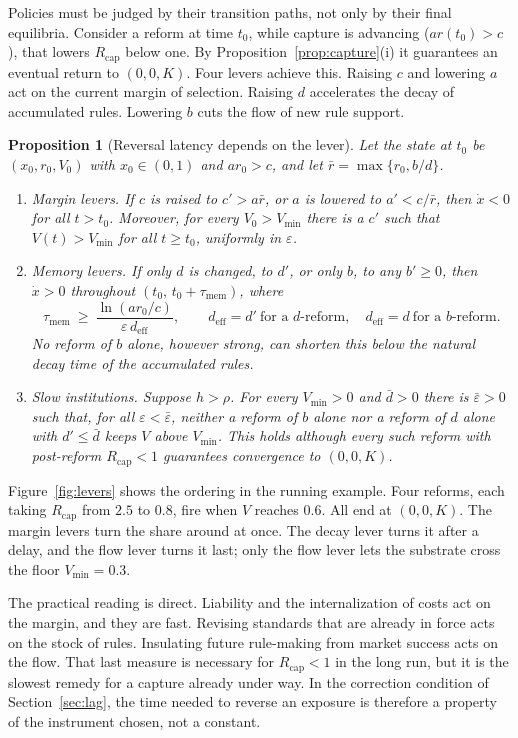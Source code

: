 \documentclass[11pt]{article}
\theoremstyle{plain}
\newtheorem{proposition}{Proposition}
\theoremstyle{definition}
\newcommand{\Rcap}{R_{\mathrm{cap}}}
\newcommand{\Vmin}{V_{\min}}
\begin{document}
Policies must be judged by their transition paths, not only by their final equilibria. Consider a reform at time $t_0$, while capture is advancing ($ar(t_0)>c$), that lowers $\Rcap$ below one. By Proposition~\ref{prop:capture}(i) it guarantees an eventual return to $(0,0,K)$. Four levers achieve this. Raising $c$ and lowering $a$ act on the current margin of selection. Raising $d$ accelerates the decay of accumulated rules. Lowering $b$ cuts the flow of new rule support.

\begin{proposition}[Reversal latency depends on the lever]\label{prop:levers}
Let the state at $t_0$ be $(x_0,r_0,V_0)$ with $x_0\in(0,1)$ and $ar_0>c$, and let $\bar r=\max\{r_0,b/d\}$.
\begin{enumerate}[label=(\roman*),leftmargin=*]
\item \emph{Margin levers.} If $c$ is raised to $c'>a\bar r$, or $a$ is lowered to $a'<c/\bar r$, then $\dot x<0$ for all $t>t_0$. Moreover, for every $V_0>\Vmin$ there is a $c'$ such that $V(t)>\Vmin$ for all $t\ge t_0$, uniformly in $\varepsilon$.
\item \emph{Memory levers.} If only $d$ is changed, to $d'$, or only $b$, to any $b'\ge0$, then $\dot x>0$ throughout $(t_0,\,t_0+\tau_{\mathrm{mem}})$, where
\[
\tau_{\mathrm{mem}}\ \ge\ \frac{\ln(ar_0/c)}{\varepsilon\, d_{\mathrm{eff}}},\qquad d_{\mathrm{eff}}=d'\ \text{for a $d$-reform},\quad d_{\mathrm{eff}}=d\ \text{for a $b$-reform}.
\]
No reform of $b$ alone, however strong, can shorten this below the natural decay time of the accumulated rules.
\item \emph{Slow institutions.} Suppose $h>\rho$. For every $\Vmin>0$ and $\bar d>0$ there is $\bar\varepsilon>0$ such that, for all $\varepsilon<\bar\varepsilon$, neither a reform of $b$ alone nor a reform of $d$ alone with $d'\le\bar d$ keeps $V$ above $\Vmin$. This holds although every such reform with post-reform $\Rcap<1$ guarantees convergence to $(0,0,K)$.
\end{enumerate}
\end{proposition}

Figure~\ref{fig:levers} shows the ordering in the running example. Four reforms, each taking $\Rcap$ from $2.5$ to $0.8$, fire when $V$ reaches $0.6$. All end at $(0,0,K)$. The margin levers turn the share around at once. The decay lever turns it after a delay, and the flow lever turns it last; only the flow lever lets the substrate cross the floor $\Vmin=0.3$.

The practical reading is direct. Liability and the internalization of costs act on the margin, and they are fast. Revising standards that are already in force acts on the stock of rules. Insulating future rule-making from market success acts on the flow. That last measure is necessary for $\Rcap<1$ in the long run, but it is the slowest remedy for a capture already under way. In the correction condition of Section~\ref{sec:lag}, the time needed to reverse an exposure is therefore a property of the instrument chosen, not a constant.
\end{document}
